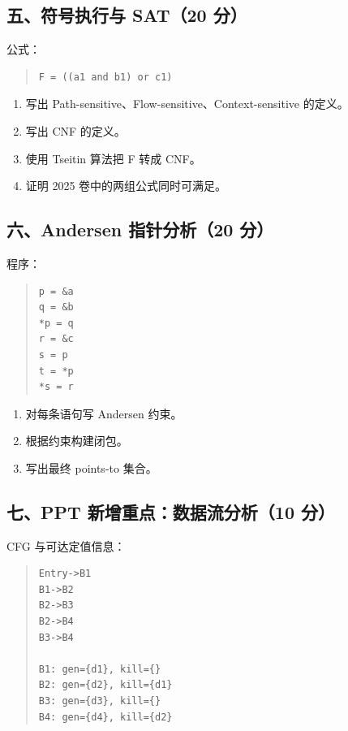 \documentclass[UTF8,zihao=-4]{ctexart}
\begin{document}
\subsection{五、符号执行与 SAT（20 分）}


公式：


\begin{quote}
\footnotesize
\begin{verbatim}
F = ((a1 and b1) or c1)
\end{verbatim}
\end{quote}


\begin{enumerate}
\item 写出 Path-sensitive、Flow-sensitive、Context-sensitive 的定义。
\item 写出 CNF 的定义。
\item 使用 Tseitin 算法把 F 转成 CNF。
\item 证明 2025 卷中的两组公式同时可满足。
\end{enumerate}


\subsection{六、Andersen 指针分析（20 分）}


程序：


\begin{quote}
\footnotesize
\begin{verbatim}
p = &a
q = &b
*p = q
r = &c
s = p
t = *p
*s = r
\end{verbatim}
\end{quote}


\begin{enumerate}
\item 对每条语句写 Andersen 约束。
\item 根据约束构建闭包。
\item 写出最终 points-to 集合。
\end{enumerate}


\subsection{七、PPT 新增重点：数据流分析（10 分）}


CFG 与可达定值信息：

\begin{quote}
\footnotesize
\begin{verbatim}
Entry->B1
B1->B2
B2->B3
B2->B4
B3->B4

B1: gen={d1}, kill={}
B2: gen={d2}, kill={d1}
B3: gen={d3}, kill={}
B4: gen={d4}, kill={d2}
\end{verbatim}
\end{quote}
\end{document}
